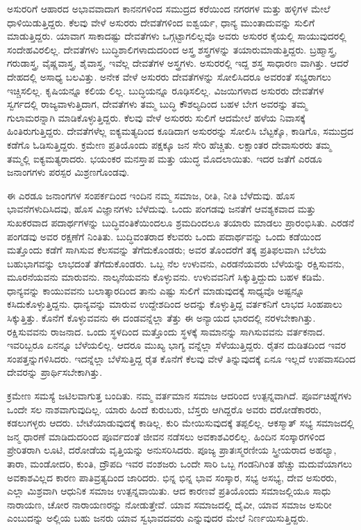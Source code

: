 ಅಸುರರಿಗೆ ಆಹಾರದ ಅಭಾವವಾದಾಗ ಕಾನನಗಳಿಂದ ಸಮುದ್ರದ ಕರೆಯಿಂದ ನಗರಗಳ ಮತ್ತು ಹಳ್ಳಿಗಳ ಮೇಲೆ ಧಾಳಿಯಿಡುತ್ತಿದ್ದರು. ಕೆಲವು ವೇಳೆ ಅಸುರರು ದೇವತೆಗಳಿಂದ ಐಶ್ವರ್ಯ, ಧಾನ್ಯ ಮುಂತಾದುವನ್ನು ಸುಲಿಗೆ ಮಾಡುತ್ತಿದ್ದರು. ಯಾವಾಗ ಸಾಕಾದಷ್ಟು ದೇವತೆಗಳು ಒಗ್ಗಟ್ಟಾಗಲಿಲ್ಲವೊ ಅವರು ಅಸುರರ ಕೈಯಲ್ಲಿ ಸಾಯುವುದರಲ್ಲಿ ಸಂದೇಹವಿರಲಿಲ್ಲ. ದೇವತೆಗಳು ಬುದ್ಧಿಶಾಲಿಗಳಾದುದರಿಂದ ಅಸ್ತ್ರ ಶಸ್ತ್ರಗಳನ್ನು ತಯಾರುಮಾಡುತ್ತಿದ್ದರು. ಬ್ರಹ್ಮಾಸ್ತ್ರ, ಗರುಡಾಸ್ತ್ರ, ವೈಷ್ಣವಾಸ್ತ್ರ, ಶೈವಾಸ್ತ್ರ, ಇವೆಲ್ಲ ದೇವತೆಗಳ ಅಸ್ತ್ರಗಳು. ಅಸುರರಲ್ಲಿ ಇದ್ದ ಶಸ್ತ್ರ ಸಾಧಾರಣ ವಾಗಿತ್ತು. ಆದರೆ ದೇಹದಲ್ಲಿ ಅಸಾಧ್ಯ ಬಲವಿತ್ತು. ಅನೇಕ ವೇಳೆ ಅಸುರರು ದೇವತೆಗಳನ್ನು ಸೋಲಿಸಿದರೂ ಅವರಂತೆ ಸಭ್ಯರಾಗಲು ಇಚ್ಚಿಸಲಿಲ್ಲ. ಕೃಷಿಯನ್ನೂ ಕಲಿಯ ಲಿಲ್ಲ. ಬುದ್ಧಿಯನ್ನೂ ರೂಢಿಸಲಿಲ್ಲ. ವಿಜಯಿಗಳಾದ ಅಸುರರು ದೇವತೆಗಳ ಸ್ವರ್ಗದಲ್ಲಿ ರಾಜ್ಯವಾಳುತ್ತಿದಾಗ, ದೇವತೆಗಳು ತಮ್ಮ ಬುದ್ಧಿ ಕೌಶಲ್ಯದಿಂದ ಬಹಳ ಬೇಗ ಅವರನ್ನು ತಮ್ಮ ಗುಲಾಮರನ್ನಾಗಿ ಮಾಡಿಕೊಳ್ಳುತ್ತಿದ್ದರು. ಕೆಲವು ವೇಳೆ ಅಸುರರು ಸುಲಿಗೆ ಆದಮೇಲೆ ಹಳೆಯ ನಿವಾಸಕ್ಕೆ ಹಿಂತಿರುಗುತ್ತಿದ್ದರು. ದೇವತೆಗಳೆಲ್ಲ ಐಕ್ಯಮತ್ಯದಿಂದ ಕೂಡಿದಾಗ ಅಸುರರನ್ನು ಸೋಲಿಸಿ ಬೆಟ್ಟಕ್ಕೊ, ಕಾಡಿಗೊ, ಸಮುದ್ರದ ಕಡೆಗೊ ಓಡಿಸುತ್ತಿದ್ದರು. ಕ್ರಮೇಣ ಪ್ರತಿಯೊಂದು ಪಕ್ಷಕ್ಕೂ ಜನ ಸೇರಿ ಹೆಚ್ಚಿತು. ಲಕ್ಷಾಂತರ ದೇವಾಸುರರು ತಮ್ಮ ತಮ್ಮಲ್ಲಿ ಐಕ್ಯಮತ್ಯರಾದರು. ಭಯಂಕರ ಮನಸ್ತಾಪ ಮತ್ತು ಯುದ್ಧ ಮೊದಲಾಯಿತು. ಇದರ ಜತೆಗೆ ಎರಡೂ ಜನಾಂಗಗಳು ಪರಸ್ಪರ ಮಿಶ್ರಣಗೊಂಡವು.

ಈ ಎರಡೂ ಜನಾಂಗಗಳ ಸಂಪರ್ಕದಿಂದ ಇಂದಿನ ನಮ್ಮ ಸಮಾಜ, ರೀತಿ, ನೀತಿ ಬೆಳೆದುವು. ಹೊಸ ಭಾವನೆಗಳುದಿಸಿದವು, ಹೊಸ ವಿಜ್ಞಾನಗಳು ಬೆಳೆದುವು. ಒಂದು ಪಂಗಡವು ಜನತೆಗೆ ಆವಶ್ಯಕವಾದ ಮತ್ತು ಸುಖಕರವಾದ ಪದಾರ್ಥಗಳನ್ನು ಬುದ್ಧಿವಂತಿಕೆಯಿಂದಲೂ ಶ್ರಮದಿಂದಲೂ ತಯಾರು ಮಾಡಲು ಪ್ರಾರಂಭಿಸಿತು. ಎರಡನೆ ಪಂಗಡವು ಅವರ ರಕ್ಷಣೆಗೆ ನಿಂತಿತು. ಬುದ್ಧಿವಂತರಾದ ಕೆಲವರು ಒಂದು ಪದಾರ್ಥವನ್ನು ಒಂದು ಕಡೆಯಿಂದ ಮತ್ತೊಂದು ಕಡೆಗೆ ಸಾಗಿಸುವ ಕೆಲಸವನ್ನು ತೆಗೆದುಕೊಂಡರು; ಅವರ ತೊಂದರೆಗೆ ತಕ್ಕ ಪ್ರತಿಫಲವಾಗಿ ಬೆಲೆಯ ಬಹುಭಾಗವನ್ನು ಲಾಭದಂತೆ ತೆಗೆದುಕೊಂಡರು. ಒಬ್ಬ ನೆಲ ಉಳುವನು, ಎರಡನೆಯವರು ಬೆಳೆಯನ್ನು ರಕ್ಷಿಸುವನು, ಮೂರನೆಯವನು ಮಾರುವನು. ನಾಲ್ಕನೆಯವನು ಕೊಳ್ಳುವನು. ಉಳುವವನಿಗೆ ಸಿಕ್ಕುತ್ತಿದ್ದುದು ಬಹಳ ಕಡಿಮೆ. ಧಾನ್ಯವನ್ನು ಕಾಯುವವನು ಬಲಾತ್ಕಾರದಿಂದ ತಾನು ಎಷ್ಟು ಸುಲಿಗೆ ಮಾಡುವುದಕ್ಕೆ ಸಾಧ್ಯವೊ ಅಷ್ಟನ್ನೂ ಕಸಿದುಕೊಳ್ಳುತ್ತಿದ್ದನು. ಧಾನ್ಯವನ್ನು ಮಾರುವ ಉದ್ದೇಶದಿಂದ ಅದನ್ನು ಕೊಳ್ಳುತ್ತಿದ್ದ ವರ್ತಕನಿಗೆ ಲಾಭದ ಸಿಂಹಪಾಲು ಸಿಕ್ಕುತ್ತಿತ್ತು. ಕೊನೆಗೆ ಕೊಳ್ಳುವವನು ಈ ದಂಡವನ್ನೆಲ್ಲಾ ತೆತ್ತು ಈ ಅನ್ಯಾಯದ ಭಾರದಲ್ಲಿ ನರಳಬೇಕಾಗಿತ್ತು. ರಕ್ಷಿಸುವವನು ರಾಜನಾದ. ಒಂದು ಸ್ಥಳದಿಂದ ಮತ್ತೊಂದು ಸ್ಥಳಕ್ಕೆ ಸಾಮಾನನ್ನು ಸಾಗಿಸುವವನು ವರ್ತಕನಾದ. ಇವರಿಬ್ಬರೂ ಏನನ್ನೂ ಬೆಳೆಯಲಿಲ್ಲ. ಆದರೂ ಮುಖ್ಯ ಭಾಗ್ಯ ವನ್ನೆಲ್ಲಾ ಸೆಳೆಯುತ್ತಿದ್ದರು. ರೈತನ ದುಡಿತದಿಂದ ಇವರ ಸಂಪತ್ತನ್ನುಗಳಿಸಿದರು. ಇದನ್ನೆಲ್ಲಾ ಬೆಳೆಸುತ್ತಿದ್ದ ರೈತ ಕೊನೆಗೆ ಕೆಲವು ವೇಳೆ ತಿನ್ನುವುದಕ್ಕೆ ಏನೂ ಇಲ್ಲದೆ ಉಪವಾಸದಿಂದ ದೇವರನ್ನು ಪ್ರಾರ್ಥಿಸಬೇಕಾಗಿತ್ತು.

ಕ್ರಮೇಣ ಸಮಸ್ಯೆ ಜಟಿಲವಾಗುತ್ತ ಬಂದಿತು. ನಮ್ಮ ವರ್ತಮಾನ ಸಮಾಜ ಆದರಿಂದ ಉತ್ಪನ್ನವಾಗಿದೆ. ಪೂರ್ವಚಿಹ್ನೆಗಳು ಒಂದೇ ಸಲ ನಾಶವಾಗುವುದಿಲ್ಲ. ಯಾರು ಹಿಂದೆ ಕುರುಬರು, ಬೆಸ್ತರು ಆಗಿದ್ದರೊ ಅವರು ದರೋಡೆಕಾರರು, ಕಡಲುಗಳ್ಳರು ಆದರು. ಬೇಟೆಯಾಡುವುದಕ್ಕೆ ಕಾಡಿಲ್ಲ. ಕುರಿ ಮೇಯಿಸುವುದಕ್ಕೆ ತಪ್ಪಲಿಲ್ಲ. ಆಕಸ್ಮಾತ್​ ಸಭ್ಯ ಸಮಾಜದಲ್ಲಿ ಜನ್ಮ ಧಾರಣೆ ಮಾಡಿದುದರಿಂದ ಪೂರ್ವದಂತೆ ಜೀವನ ನಡೆಸಲು ಅವಕಾಶವಿರಲಿಲ್ಲ. ಹಿಂದಿನ ಸಂಸ್ಕಾರಗಳಿಂದ ಪ್ರೇರಿತರಾಗಿ ಲೂಟಿ, ದರೋಡೆಯ ವೃತ್ತಿಯನ್ನು ಅನುಸರಿಸಿದರು. ಪೂಜ್ಯ ಪ್ರಾತಃಸ್ಮರಣೀಯ ಸ್ತ್ರೀಯರಾದ ಅಹಲ್ಯಾ, ತಾರಾ, ಮಂಡೋದರಿ, ಕುಂತಿ, ದ್ರೌಪದಿ ಇವರ ವಂಶಜರು ಒಂದೇ ಸಾರಿ ಒಬ್ಬ ಗಂಡನಿಗಿಂತ ಹೆಚ್ಚು ಮದುವೆಯಾಗಲು ಅವಕಾಶವಿಲ್ಲದ ಕಾರಣ ಪಾತಿವ್ರತ್ಯದಿಂದ ಜಾರಿದರು. ಭಿನ್ನ ಭಿನ್ನ ಭಾವ ಸಂಸ್ಕಾರ, ಸಭ್ಯ ಅಸಭ್ಯ, ದೇವ ಅಸುರರು, ಎಲ್ಲಾ ಮಿಶ್ರವಾಗಿ ಆಧುನಿಕ ಸಮಾಜ ಉತ್ಪನ್ನವಾಯಿತು. ಆದ ಕಾರಣವೆ ಪ್ರತಿಯೊಂದು ಸಮಾಜಲ್ಲಿಯೂ ಸಾಧು ನಾರಾಯಣ, ಚೋರ ನಾರಾಯಣರನ್ನು ನೋಡುತ್ತೇವೆ. ಯಾವ ಸಮಾಜದಲ್ಲಿ ದೈವೀ, ಯಾವ ಸಮಾಜ ಅಸುರೀ ಎಂಬುದನ್ನು ಅಲ್ಲಿಯ ಬಹು ಜನರು ಯಾವ ಸ್ವಭಾವದವರು ಎನ್ನುವುದರ ಮೇಲೆ ನಿರ್ಣಯಿಸುತ್ತಿದ್ದರು.

